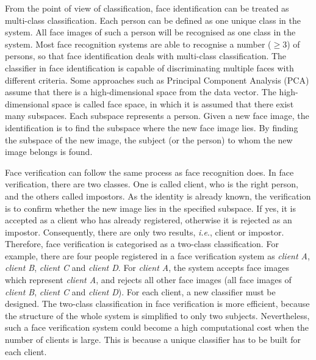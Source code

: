 From the point of view of classification, face identification can be treated as multi-class classification. Each person can be defined as one unique class in the system. All face images of such a person will be recognised as one class in the system. Most face recognition systems are able to recognise a number ($\geq 3$) of persons, so that face identification deals with multi-class classification. The classifier in face identification is capable of discriminating multiple faces with different criteria. Some approaches such as Principal Component Analysis (PCA) assume that there is a high-dimensional space from the data vector. The high-dimensional space is called face space, in which it is assumed that there exist many subspaces. Each subspace represents a person. Given a new face image, the identification is to find the subspace where the new face image lies. By finding the subspace of the new image, the subject (or the person) to whom the new image belongs is found. 

Face verification can follow the same process as face recognition does. In face verification, there are two classes. One is called client, who is the right person, and the others called impostors. As the identity is already known, the verification is to confirm whether the new image lies in the specified subspace. If yes, it is accepted as a client who has already registered, otherwise it is rejected as an impostor. Consequently, there are only two results, \textit{i.e}., client or impostor. Therefore, face verification is categorised as a two-class classification. For example, there are four people registered in a face verification system as \textit{client A}, \textit{client B}, \textit{client C} and \textit{client D}. For \textit{client A}, the system accepts face images which represent \textit{client A}, and rejects all other face images (all face images of \textit{client B}, \textit{client C} and \textit{client D}).  For each client, a new classifier must be designed. The two-class classification in face verification is more efficient, because the structure of the whole system is simplified to only two subjects. Nevertheless, such a face verification system could become a high computational cost when the number of clients is large. This is because a unique classifier has to be built for each client. 


